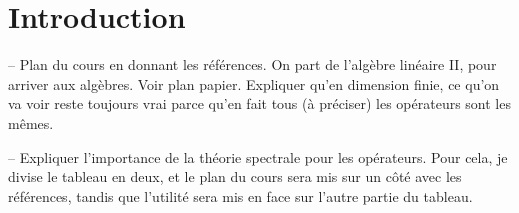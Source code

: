 \section{Introduction}





-- Plan du cours en donnant les références. On part de l'algèbre linéaire II,
pour arriver aux algèbres. Voir plan papier. Expliquer qu'en dimension finie, ce
qu'on va voir reste toujours vrai parce qu'en fait tous (à préciser) les
opérateurs sont les mêmes.

-- Expliquer l'importance de la théorie spectrale pour les opérateurs. Pour
cela, je divise le tableau en deux, et le plan du cours sera mis sur un côté
avec les références, tandis que l'utilité sera mis en face sur l'autre partie du
tableau.
